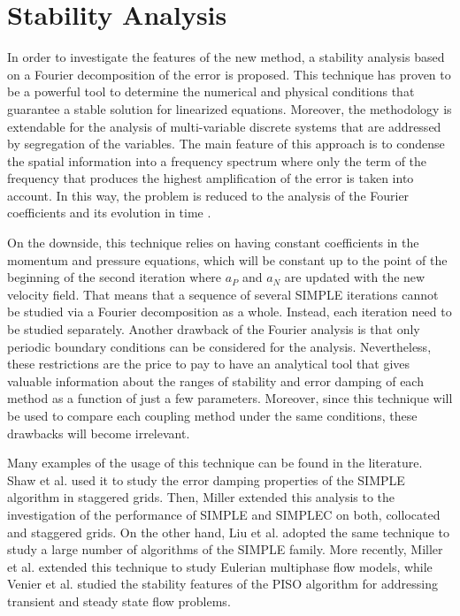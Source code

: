 \documentclass[final,3p,times,11pt,onecolumn]{myElsarticle}
\numberwithin{equation}{section}
\begin{document}
\section{Stability Analysis}
\label{sec:fourier}

In order to investigate the features of the new method, a stability analysis based on a Fourier decomposition of the error is proposed. This technique has proven to be a powerful tool to determine the numerical and physical conditions that guarantee a stable solution for linearized equations. Moreover, the methodology is extendable for the analysis of multi-variable discrete systems that are addressed by segregation of the variables. The main feature of this approach is to condense the spatial information into a frequency spectrum where only the term of the frequency that produces the highest amplification of the error is taken into account. In this way, the problem is reduced to the analysis of the Fourier coefficients and its evolution in time \cite{hirsch}. 

On the downside, this technique relies on having constant coefficients in the momentum and pressure equations, which will be constant up to the point of the beginning of the second iteration where $a_P$ and $a_N$ are updated with the new velocity field. That means that a sequence of several SIMPLE iterations cannot be studied via a Fourier decomposition as a whole. Instead, each iteration need to be studied separately. Another drawback of the Fourier analysis is that only periodic boundary conditions can be considered for the analysis. Nevertheless, these restrictions are the price to pay to have an analytical tool that gives valuable information about the ranges of stability and error damping of each method as a function of just a few parameters. Moreover, since this technique will be used to compare each coupling method under the same conditions, these drawbacks will become irrelevant.

Many examples of the usage of this technique can be found in the literature. Shaw et al. \cite{shaw} used it to study the error damping properties of the SIMPLE algorithm in staggered grids. Then, Miller \cite{miller1} extended this analysis to the investigation of the performance of SIMPLE and SIMPLEC on both, collocated and staggered grids. On the other hand, Liu et al. \cite{liu} adopted the same technique to study a large number of algorithms of the SIMPLE family. More recently, Miller et al. \cite{miller2} extended this technique to study Eulerian multiphase flow models, while Venier et al. \cite{venier} studied the stability features of the PISO algorithm for addressing transient and steady state flow problems.
\end{document}

